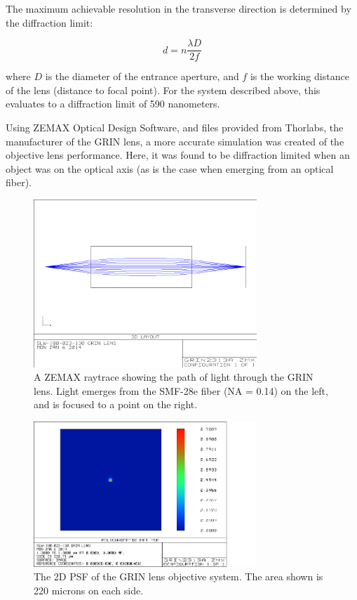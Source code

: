 The maximum achievable resolution in the transverse direction is determined by the diffraction limit:

\begin{equation} \label{eq:tres2}
d = n\frac{\lambda D}{2f}
\end{equation}

where $D$ is the diameter of the entrance aperture, and $f$ is the working distance of the lens (distance to focal point). For the system described above, this evaluates to a diffraction limit of 590 nanometers.

Using ZEMAX Optical Design Software, and files provided from Thorlabs, the manufacturer of the GRIN lens, a more accurate simulation was created of the objective lens performance. Here, it was found to be diffraction limited when an object was on the optical axis (as is the case when emerging from an optical fiber).

\begin{figure}[h!]
\centering
\includegraphics[width=0.75\textwidth]{Images/Zemax/GRO-raytrace.png}
\caption{A ZEMAX raytrace showing the path of light through the GRIN lens. Light emerges from the SMF-28e fiber (NA = 0.14) on the left, and is focused to a point on the right.}
\end{figure}

\begin{figure}[h!]
\centering
\includegraphics[width=0.75\textwidth]{Images/Zemax/GRO-psf.png}
\caption{The 2D PSF of the GRIN lens objective system. The area shown is 220 microns on each side.}
\end{figure}

